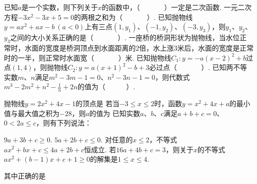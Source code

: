 \documentclass[10pt]{article}
\begin{document}
\showsecret
{}
\informationline
\begin{questions}{\selectingintroduction}
    \question 已知$a$是一个实数，则下列关于$x$的函数中，（~~~~~~~）一定是二次函数.
    \question 一元二次方程$-3x^2-3x+5=0$的两根之和为（~~~~~~~）.
    \question %
    \question %
    \question 已知抛物线$y=ax^2+ax-b \ (a < 0)$上有三点$(1,y_1)$、$(-1,y_2)$、$(-3,y_3)$，则$y_1$、$y_2$、$y_3$之间的大小关系正确的是（~~~~~~~）.
    \question %
    \question 一座桥的桥洞形状为抛物线，当水位正常时，水面的宽度是桥洞顶点到水面距离的2倍，水上涨3米后，水面的宽度是正常时的一半，则正常时水面宽（~~~~~~~）米.
    \question 已知抛物线$C_1:y=-a(x-2)^2+b$过点$(1,4)$，则抛物线$C_2:y=a(x+1)^2-b+3$必过点（~~~~~~~）.
    \question 已知两不等实数$m$、$n$满足$m^2-3m-1=0$、$n^2-3n-1=0$，则代数式$m^3-2m^2+n^2-\frac{1}{n}+2n$的值为（~~~~~~）.
    \question %
\end{questions}

\begin{questions}{\complitingintroduction}
    \question 抛物线$y=2x^2+4x-1$的顶点是\complitingline
    \question %
    \question 若当$-3 \leq x \leq 2$时，函数$y=x^2+4x+a$的最小值与最大值之积为$-28$，则$a$的值为\complitingline
    \question %
    \question 已知实数$a$、$b$、$c$满足$a+b+c=0$、$0 < 2a \leq c$，则有下列说法：
    \begin{subsubquestions}
        \subsubquestion $9a+3b+c \geq 0$.
        \subsubquestion $5a+2b+c \leq 0$.
        \subsubquestion 对任意的$x \leq 2$，不等式$ax^2+bx+c \leq 4a+2b+c$恒成立.
        \subsubquestion 若$16a+4b+c=3$，则关于$x$的不等式$ax^2+(b-1)x+c+1 \geq 0$的解集是$1 \leq x \leq 4$.
    \end{subsubquestions}
    其中正确的是\complitingline
    \question %
\end{questions}
\end{document}
